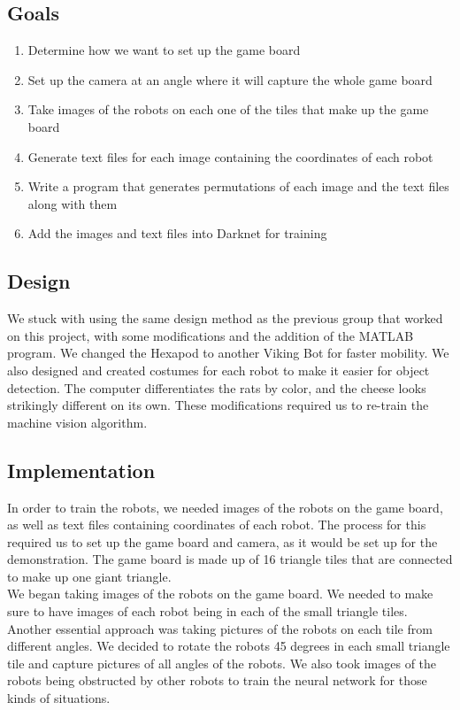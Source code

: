 \documentclass[a4paper,12pt]{article}
\begin{document}
\subsection{Goals}
	\begin{enumerate}
		\item Determine how we want to set up the game board
		\item Set up the camera at an angle where it will capture the whole game board
		\item Take images of the robots on each one of the tiles that make up the game board
		\item Generate text files for each image containing the coordinates of each robot
		\item Write a program that generates permutations of each image and the text files along with them
		\item Add the images and text files into Darknet for training
	\end{enumerate}

\subsection{Design}
	We stuck with using the same design method as the previous group that worked on this project, with some modifications and the addition of the MATLAB program. We changed the Hexapod to another Viking Bot for faster mobility. We also designed and created costumes for each robot to make it easier for object detection. The computer differentiates the rats by color, and the cheese looks strikingly different on its own. These modifications required us to re-train the machine vision algorithm.

\subsection{Implementation}
	In order to train the robots, we needed images of the robots on the game board, as well as text files containing coordinates of each robot. The process for this required us to set up the game board and camera, as it would be set up for the demonstration. The game board is made up of 16 triangle tiles that are connected to make up one giant triangle.\\

	We began taking images of the robots on the game board. We needed to make sure to have images of each robot being in each of the small triangle tiles. Another essential approach was taking pictures of the robots on each tile from different angles. We decided to rotate the robots 45 degrees in each small triangle tile and capture pictures of all angles of the robots. We also took images of the robots being obstructed by other robots to train the neural network for those kinds of situations.\\
\end{document}
